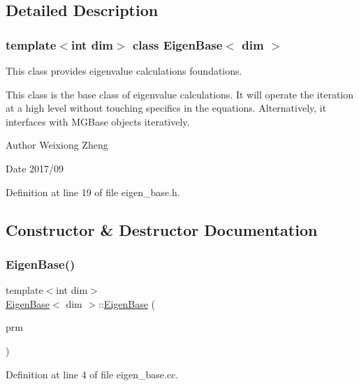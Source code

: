 \subsection{Detailed Description}
\subsubsection*{template$<$int dim$>$\newline
class Eigen\+Base$<$ dim $>$}

This class provides eigenvalue calculations foundations. 

This class is the base class of eigenvalue calculations. It will operate the iteration at a high level without touching specifics in the equations. Alternatively, it interfaces with M\+G\+Base objects iteratively.

\begin{DoxyAuthor}{Author}
Weixiong Zheng 
\end{DoxyAuthor}
\begin{DoxyDate}{Date}
2017/09 
\end{DoxyDate}


Definition at line 19 of file eigen\+\_\+base.\+h.



\subsection{Constructor \& Destructor Documentation}
\mbox{\label{class_eigen_base_a041823ed11437980ff73ada87a9717fe}} 
\subsubsection{\texorpdfstring{Eigen\+Base()}{EigenBase()}}
{\footnotesize\ttfamily template$<$int dim$>$ \\
\hyperlink{class_eigen_base}{Eigen\+Base}$<$ dim $>$\+::\hyperlink{class_eigen_base}{Eigen\+Base} (\begin{DoxyParamCaption}\item[{const Parameter\+Handler \&}]{prm }\end{DoxyParamCaption})}



Definition at line 4 of file eigen\+\_\+base.\+cc.

\mbox{\label{class_eigen_base_afe9efbe26f3d5a427caa1d5022555038}} 
